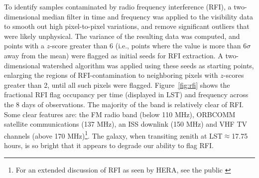 \documentclass[twocolumn, trackchanges]{aastex61}
\begin{document}

To identify samples contaminated by radio frequency interference (RFI), a two-dimensional median filter in time and frequency was applied to the visibility data to smooth out high pixel-to-pixel variations, and remove significant outliers that were likely unphysical. The variance of the resulting data was computed, and points with a $z$-score greater than 6 (i.e., points where the value is more than 6$\sigma$ away from the mean) were flagged as initial seeds for RFI extraction. A two-dimensional watershed algorithm was applied using these seeds as starting points, enlarging the regions of RFI-contamination to neighboring pixels with $z$-scores greater than 2, until all such pixels were flagged. Figure~\ref{fig:rfi} shows the fractional RFI flag occupancy per time (displayed in LST) and frequency across the 8 days of observations. The majority of the band is relatively clear of RFI. Some clear features are: the FM radio band (below 110 MHz), ORBCOMM satellite communications (137 MHz), an ISS downlink (150 MHz) and VHF TV channels (above 170 MHz)\footnote{For an extended discussion of RFI as seen by HERA, see the public \href{http://reionization.org/wp-content/uploads/2013/03/HERAMemo19_HERA_dish_RFI.pdf}{}}.
The galaxy, when transiting zenith at LST$\approx$17.75 hours, is so bright that it appears to degrade our ability to flag RFI.

\end{document}
